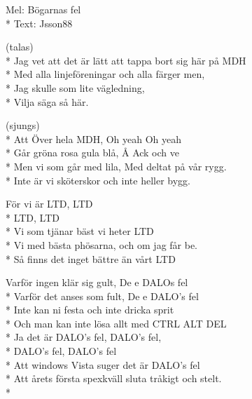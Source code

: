 

\pagestyle{Föreningssånger}

\begin{SongText}
\begin{SongInfo}
Mel: Bögarnas fel\\*%
Text: Jsson88
\end{SongInfo}
\begin{Verse}
    (talas)\\*%
    Jag vet att det är lätt att tappa bort sig här på MDH\\*%
    Med alla linjeföreningar och alla färger men, \\*%
    Jag skulle som lite vägledning, \\*%
    Vilja säga så här.
\end{Verse}
\begin{Verse}
    (sjungs)\\*%
    Att Över hela MDH, Oh yeah Oh yeah\\*%
    Går gröna rosa gula blå, Å Ack och ve\\*%
    Men vi som går med lila, Med deltat på vår rygg.\\*%
    Inte är vi sköterskor och inte heller bygg.
\end{Verse}
\begin{Verse}
    För vi är LTD, LTD\\*%
    LTD, LTD\\*%
    Vi som tjänar bäst vi heter LTD\\*%
    Vi med bästa phösarna, och om jag får be.\\*%
    Så finns det inget bättre än vårt LTD
\end{Verse}
\begin{Verse}
    Varför ingen klär sig gult, De e DALOs fel\\*%
    Varför det anses som fult, De e DALO's fel\\*%
    Inte kan ni festa och inte dricka sprit\\*%
    Och man kan inte lösa allt med CTRL ALT DEL\\*%
    Ja det är DALO's fel, DALO's fel, \\*%
    DALO's fel, DALO's fel\\*%
    Att windows Vista suger det är DALO's fel\\*%
    Att årets första spexkväll sluta tråkigt och stelt.\\*%

\end{Verse}
\end{SongText}
